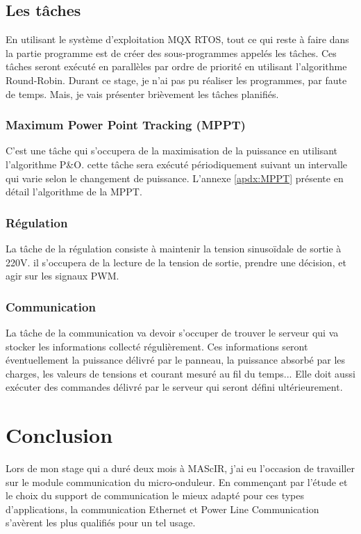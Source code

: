 \documentclass[11pt, a4paper, twoside]{book}
\begin{document}
{\section{Les tâches}
En utilisant le système d'exploitation MQX RTOS, tout ce qui reste à faire dans la partie programme est de créer des sous-programmes appelés les tâches. Ces tâches seront exécuté en parallèles par ordre de priorité en utilisant l'algorithme Round-Robin. Durant ce stage, je n'ai pas pu réaliser les programmes, par faute de temps. Mais, je vais présenter brièvement les tâches planifiés.
\subsection{Maximum Power Point Tracking (MPPT)}
C'est une tâche qui s'occupera de la maximisation de la puissance en utilisant l'algorithme P\&O. cette tâche sera exécuté périodiquement suivant un intervalle qui varie selon le changement de puissance. L'annexe \ref{apdx:MPPT} présente en détail l'algorithme de la MPPT.
\subsection{Régulation}
La tâche de la régulation consiste à maintenir la tension sinusoïdale de sortie à 220V. il s'occupera de la lecture de la tension de sortie, prendre une décision, et agir sur les signaux PWM.

\subsection{Communication}
La tâche de la communication va devoir s'occuper de trouver le serveur qui va stocker les informations collecté régulièrement. Ces informations seront éventuellement la puissance délivré par le panneau, la puissance absorbé par les charges, les valeurs de tensions et courant mesuré au fil du temps... Elle doit aussi exécuter des commandes délivré par le serveur qui seront défini ultérieurement.

\chapter*{Conclusion}
Lors de mon stage qui a duré deux mois à MAScIR, j'ai eu l'occasion de travailler sur le module communication du micro-onduleur. En commençant par l'étude et le choix du support de communication le mieux adapté pour ces types d'applications, la communication Ethernet et Power Line Communication s'avèrent les plus qualifiés pour un tel usage.\\

}
\end{document}
